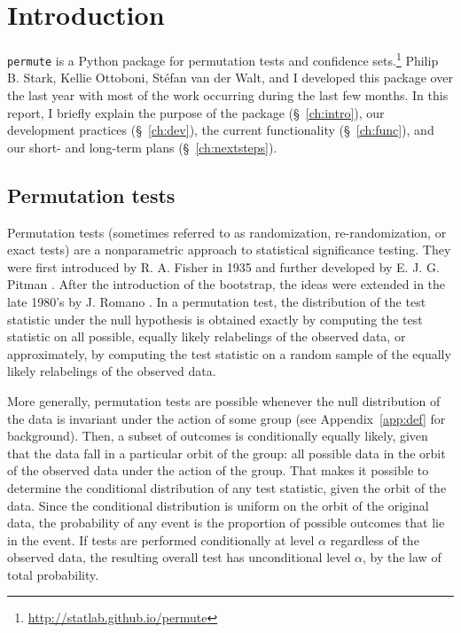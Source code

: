 \chapter{\label{ch:intro}Introduction}

\texttt{permute} is a Python package for permutation tests and confidence
sets.\footnote{\url{http://statlab.github.io/permute}} Philip B. Stark, Kellie
Ottoboni, St\'{e}fan van der Walt, and I developed this package over the last
year with most of the work occurring during the last few months.  In this
report, I briefly explain the purpose of the package (\S~\ref{ch:intro}), our
development practices (\S~\ref{ch:dev}), the current functionality
(\S~\ref{ch:func}), and our short- and long-term plans (\S~\ref{ch:nextsteps}).

\section{Permutation tests}

Permutation tests (sometimes referred to as randomization, re-randomization, or
exact tests) are a nonparametric approach to statistical significance testing.
They were first introduced by R. A. Fisher in 1935 \cite{fisher1935design} and
further developed by E. J. G. Pitman  \cite{pitman1937,
pitman1938significance}.  After the introduction of the bootstrap, the ideas
were extended in the late 1980's by J. Romano \cite{romano1988bootstrap,
romano1989bootstrap}.
In a permutation test, the distribution of the test statistic under the null
hypothesis is obtained exactly by computing the test statistic on all possible,
equally likely relabelings of the observed data, or approximately, by computing
the test statistic on a random sample of the equally likely relabelings of the
observed data.

More generally, permutation tests are possible whenever the
null distribution of the data is invariant under the action of some group (see Appendix~\ref{app:def} for background).
Then, a subset of outcomes is conditionally equally likely, given that the data
fall in a particular orbit of the group: all possible data in the orbit of the
observed data under the action of the group. 
That makes it possible to
determine the conditional distribution of any test statistic, given the orbit
of the data.
Since the conditional distribution is uniform on the orbit of the
original data, the probability of any event is the proportion of possible
outcomes that lie in the event.
If tests are performed conditionally at level $\alpha$ regardless
of the observed data, the resulting overall test has unconditional level
$\alpha$, by the law of total probability.

